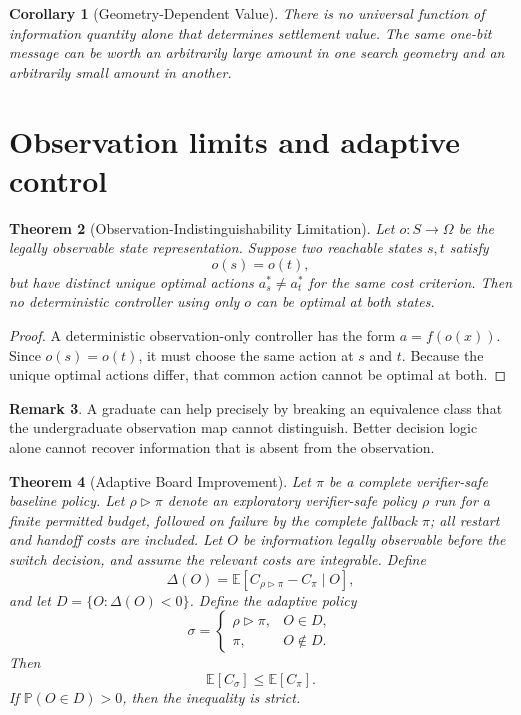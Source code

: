 \documentclass[11pt]{article}
\newtheorem{theorem}{Theorem}[section]
\newtheorem{corollary}[theorem]{Corollary}
\theoremstyle{definition}
\newtheorem{remark}[theorem]{Remark}
\newcommand{\E}{\mathbb{E}}
\newcommand{\Prb}{\mathbb{P}}
\begin{document}
\begin{corollary}[Geometry-Dependent Value]
There is no universal function of information quantity alone that determines settlement value.  The same one-bit message can be worth an arbitrarily large amount in one search geometry and an arbitrarily small amount in another.
\end{corollary}

\section{Observation limits and adaptive control}

\begin{theorem}[Observation-Indistinguishability Limitation]
Let $o:S\to\Omega$ be the legally observable state representation.  Suppose two reachable states $s,t$ satisfy
\[
o(s)=o(t),
\]
but have distinct unique optimal actions $a_s^*\ne a_t^*$ for the same cost criterion.  Then no deterministic controller using only $o$ can be optimal at both states.
\end{theorem}

\begin{proof}
A deterministic observation-only controller has the form $a=f(o(x))$.  Since $o(s)=o(t)$, it must choose the same action at $s$ and $t$.  Because the unique optimal actions differ, that common action cannot be optimal at both.
\end{proof}

\begin{remark}
A graduate can help precisely by breaking an equivalence class that the undergraduate observation map cannot distinguish.  Better decision logic alone cannot recover information that is absent from the observation.
\end{remark}

\begin{theorem}[Adaptive Board Improvement]
Let $\pi$ be a complete verifier-safe baseline policy.  Let $\rho\triangleright\pi$ denote an exploratory verifier-safe policy $\rho$ run for a finite permitted budget, followed on failure by the complete fallback $\pi$; all restart and handoff costs are included.  Let $O$ be information legally observable before the switch decision, and assume the relevant costs are integrable.  Define
\[
\Delta(O)
=
\E\!\left[C_{\rho\triangleright\pi}-C_\pi\mid O\right],
\]
and let $D=\{O:\Delta(O)<0\}$.  Define the adaptive policy
\[
\sigma=
\begin{cases}
\rho\triangleright\pi,& O\in D,\\
\pi,& O\notin D.
\end{cases}
\]
Then
\[
\E[C_\sigma]\le \E[C_\pi].
\]
If $\Prb(O\in D)>0$, then the inequality is strict.
\end{theorem}
\end{document}

